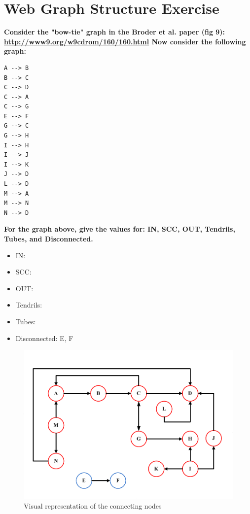 \documentclass{article}
\begin{document}
\newpage

\section{Web Graph Structure Exercise}
\textbf{Consider the "bow-tie" graph in the Broder et al. paper (fig 9): \url{http://www9.org/w9cdrom/160/160.html}
Now consider the following graph:}

\begin{verbatim}
A --> B
B --> C
C --> D
C --> A
C --> G
E --> F
G --> C
G --> H
I --> H
I --> J
I --> K
J --> D 
L --> D
M --> A
M --> N
N --> D
\end{verbatim}

\textbf{For the graph above, give the values for: IN, SCC, OUT, Tendrils, Tubes, and Disconnected.}

\newpage

\begin{itemize}
\item IN:
\item SCC:
\item OUT:
\item Tendrils:
\item Tubes:
\item Disconnected: E, F
\end{itemize}


\begin{figure}[H]
\centering
\includegraphics[scale=0.50]{assn01Q03}
\caption{Visual representation of the connecting nodes}
\end{figure}
\end{document}
